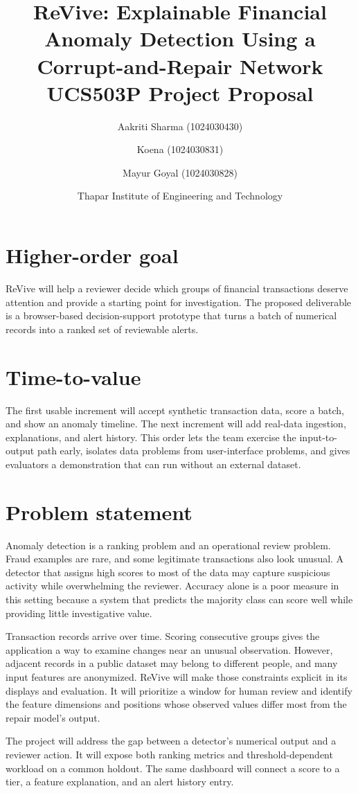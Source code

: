 \documentclass[11pt,a4paper]{article}
\title{ReVive: Explainable Financial Anomaly Detection Using a Corrupt-and-Repair Network\\\large UCS503P Project Proposal}
\author{Aakriti Sharma (1024030430) \and Koena (1024030831) \and Mayur Goyal (1024030828)}
\date{Thapar Institute of Engineering and Technology}
\begin{document}
\maketitle

\section{Higher-order goal}
ReVive will help a reviewer decide which groups of financial transactions deserve attention and provide a starting point for investigation. The proposed deliverable is a browser-based decision-support prototype that turns a batch of numerical records into a ranked set of reviewable alerts.

\section{Time-to-value}
The first usable increment will accept synthetic transaction data, score a batch, and show an anomaly timeline. The next increment will add real-data ingestion, explanations, and alert history. This order lets the team exercise the input-to-output path early, isolates data problems from user-interface problems, and gives evaluators a demonstration that can run without an external dataset.

\section{Problem statement}
Anomaly detection is a ranking problem and an operational review problem. Fraud examples are rare, and some legitimate transactions also look unusual. A detector that assigns high scores to most of the data may capture suspicious activity while overwhelming the reviewer. Accuracy alone is a poor measure in this setting because a system that predicts the majority class can score well while providing little investigative value.

Transaction records arrive over time. Scoring consecutive groups gives the application a way to examine changes near an unusual observation. However, adjacent records in a public dataset may belong to different people, and many input features are anonymized. ReVive will make those constraints explicit in its displays and evaluation. It will prioritize a window for human review and identify the feature dimensions and positions whose observed values differ most from the repair model's output.

The project will address the gap between a detector's numerical output and a reviewer action. It will expose both ranking metrics and threshold-dependent workload on a common holdout. The same dashboard will connect a score to a tier, a feature explanation, and an alert history entry.
\end{document}

